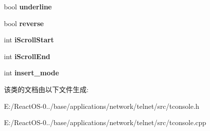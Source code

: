 \begin{DoxyCompactItemize}
bool {\bfseries underline}
\item 
\mbox{\label{class_t_console_a086a138d76901251fae422d4903556a6}} 
bool {\bfseries reverse}
\item 
\mbox{\label{class_t_console_ad0242cb976ef34dff2af499f9a7d4db5}} 
int {\bfseries i\+Scroll\+Start}
\item 
\mbox{\label{class_t_console_a90b078565a4465e9ca4cfbd84f80b79a}} 
int {\bfseries i\+Scroll\+End}
\item 
\mbox{\label{class_t_console_ac42b9815c721e43c6715abdd5653c47e}} 
int {\bfseries insert\+\_\+mode}
\end{DoxyCompactItemize}


该类的文档由以下文件生成\+:\begin{DoxyCompactItemize}
\item 
E\+:/\+React\+O\+S-\/0../base/applications/network/telnet/src/tconsole.\+h\item 
E\+:/\+React\+O\+S-\/0../base/applications/network/telnet/src/tconsole.\+cpp\end{DoxyCompactItemize}

